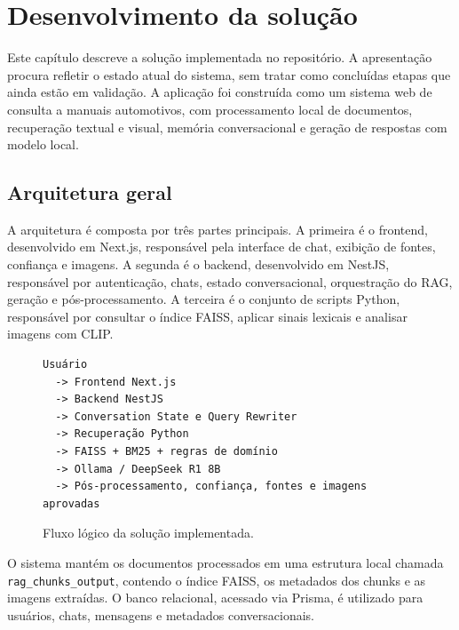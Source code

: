 \chapter{Desenvolvimento da solução}
\label{cap:desenvolvimento}

Este capítulo descreve a solução implementada no repositório. A apresentação procura refletir o estado atual do sistema, sem tratar como concluídas etapas que ainda estão em validação. A aplicação foi construída como um sistema web de consulta a manuais automotivos, com processamento local de documentos, recuperação textual e visual, memória conversacional e geração de respostas com modelo local.

\section{Arquitetura geral}

A arquitetura é composta por três partes principais. A primeira é o frontend, desenvolvido em Next.js, responsável pela interface de chat, exibição de fontes, confiança e imagens. A segunda é o backend, desenvolvido em NestJS, responsável por autenticação, chats, estado conversacional, orquestração do RAG, geração e pós-processamento. A terceira é o conjunto de scripts Python, responsável por consultar o índice FAISS, aplicar sinais lexicais e analisar imagens com CLIP.

\begin{figure}[H]
\centering
\begin{minipage}{0.88\textwidth}
\begin{verbatim}
Usuário
  -> Frontend Next.js
  -> Backend NestJS
  -> Conversation State e Query Rewriter
  -> Recuperação Python
  -> FAISS + BM25 + regras de domínio
  -> Ollama / DeepSeek R1 8B
  -> Pós-processamento, confiança, fontes e imagens aprovadas
\end{verbatim}
\end{minipage}
\caption{Fluxo lógico da solução implementada.}
\label{fig:arquitetura}
\end{figure}

O sistema mantém os documentos processados em uma estrutura local chamada \texttt{rag\_chunks\_output}, contendo o índice FAISS, os metadados dos chunks e as imagens extraídas. O banco relacional, acessado via Prisma, é utilizado para usuários, chats, mensagens e metadados conversacionais.

